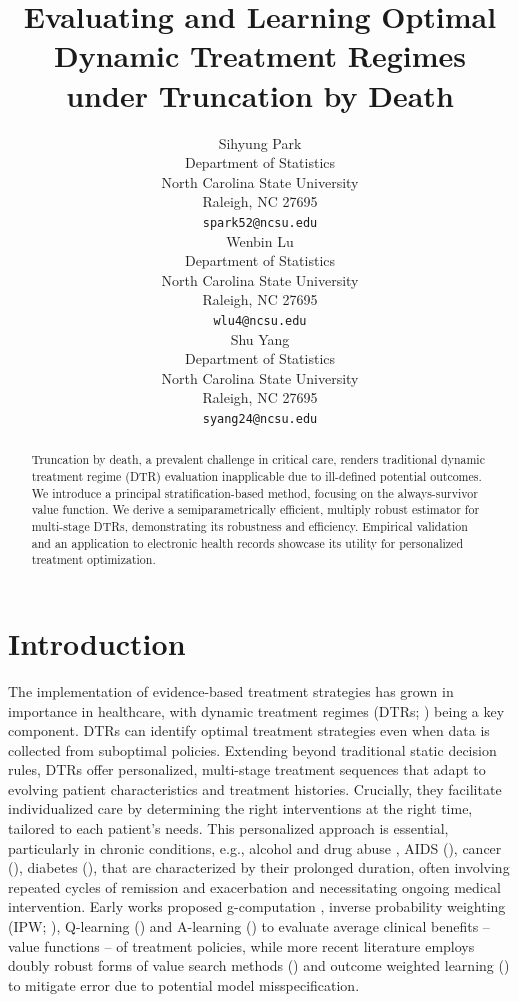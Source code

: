 \documentclass{article}
\title{Evaluating and Learning Optimal Dynamic Treatment Regimes under Truncation by Death}
\author{%
  Sihyung Park \\
  Department of Statistics\\
  North Carolina State University\\
  Raleigh, NC 27695 \\
  \texttt{spark52@ncsu.edu} \\
  \And
   Wenbin Lu \\
   Department of Statistics\\
   North Carolina State University\\
   Raleigh, NC 27695 \\
   \texttt{wlu4@ncsu.edu} \\
  \AND
   Shu Yang \\
   Department of Statistics\\
   North Carolina State University\\
   Raleigh, NC 27695 \\
   \texttt{syang24@ncsu.edu} \\
}
\begin{document}
\maketitle


\begin{abstract}
Truncation by death, a prevalent challenge in critical care, renders traditional dynamic treatment regime (DTR) evaluation inapplicable due to ill-defined potential outcomes. 
We introduce a principal stratification-based method, focusing on the always-survivor value function. We derive a semiparametrically efficient, multiply robust estimator for multi-stage DTRs, demonstrating its robustness and efficiency. 
Empirical validation and an application to electronic health records showcase its utility for personalized treatment optimization.
\end{abstract}


%
%
\section{Introduction}

The implementation of evidence-based treatment strategies has grown in importance in healthcare, with dynamic treatment regimes (DTRs; \citealp{dtrrobins1997}) being a key component. 
DTRs can identify optimal treatment strategies even when data is collected from suboptimal policies. Extending beyond traditional static decision rules, DTRs offer personalized, multi-stage treatment sequences that adapt to evolving patient characteristics and treatment histories. Crucially, they facilitate individualized care by determining the right interventions at the right time, tailored to each patient's needs. This personalized approach is essential, particularly in chronic conditions, e.g., alcohol and drug abuse \citep{chronicmurphy2007}, AIDS (\citealp{dtrrobins1989aids}), cancer (\citealp{cancerzhao2009}), diabetes (\citealp{DTRchakraborty2014}), that are characterized by their prolonged duration, often involving repeated cycles of remission and exacerbation and necessitating ongoing medical intervention. Early works proposed g-computation \citep{dtrrobins1997}, inverse probability weighting (IPW; \citealp{robins2000marginal}), Q-learning (\citealp{watkins1992q}) and A-learning (\citealp{dtrmurphy2003}) to evaluate average clinical benefits -- value functions -- of treatment policies, while more recent literature employs doubly robust forms of value search methods (\citealp{zhang2013robust}) and outcome weighted learning (\citealp{owlliu2018}) to mitigate error due to potential model misspecification.
\end{document}
